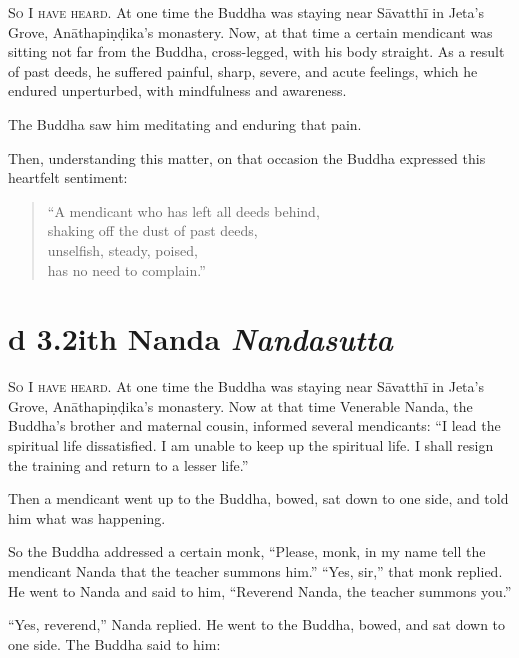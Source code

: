 \documentclass[12pt,openany]{book}%
\newcommand*{\suttatitleacronym}[1]{\smaller[2]{#1}\vspace*{.3em}}
\newcommand*{\suttatitletranslation}[1]{\linebreak{#1}}
\newcommand*{\suttatitleroot}[1]{\linebreak\smaller[2]\itshape{#1}}
\newcommand*{\tocacronym}[1]{\hspace*{-3.3em}{#1}\quad}
\newcommand*{\toctranslation}[1]{#1}
\newcommand*{\tocroot}[1]{(\textit{#1})}
\newcommand*{\scevam}[1]{\textsc{#1}}
\begin{document}
\scevam{So I have heard. }At one time the Buddha was staying near \textsanskrit{Sāvatthī} in Jeta’s Grove, \textsanskrit{Anāthapiṇḍika}’s monastery. Now, at that time a certain mendicant was sitting not far from the Buddha, cross-legged, with his body straight. As a result of past deeds, he suffered painful, sharp, severe, and acute feelings, which he endured unperturbed, with mindfulness and awareness. 

The Buddha saw him meditating and enduring that pain. 

Then, understanding this matter, on that occasion the Buddha expressed this heartfelt sentiment: 

\begin{verse}%
“A mendicant who has left all deeds behind, \\
shaking off the dust of past deeds, \\
unselfish, steady, poised, \\
has no need to complain.” 

%
\end{verse}

%
\section*{{\suttatitleacronym Ud 3.2}{\suttatitletranslation With Nanda }{\suttatitleroot Nandasutta}}
\addcontentsline{toc}{section}{\tocacronym{Ud 3.2} \toctranslation{With Nanda } \tocroot{Nandasutta}}

\scevam{So I have heard. }At one time the Buddha was staying near \textsanskrit{Sāvatthī} in Jeta’s Grove, \textsanskrit{Anāthapiṇḍika}’s monastery. Now at that time Venerable Nanda, the Buddha’s brother and maternal cousin, informed several mendicants: “I lead the spiritual life dissatisfied. I am unable to keep up the spiritual life. I shall resign the training and return to a lesser life.” 

Then a mendicant went up to the Buddha, bowed, sat down to one side, and told him what was happening. 

So the Buddha addressed a certain monk, “Please, monk, in my name tell the mendicant Nanda that the teacher summons him.” “Yes, sir,” that monk replied. He went to Nanda and said to him, “Reverend Nanda, the teacher summons you.” 

“Yes, reverend,” Nanda replied. He went to the Buddha, bowed, and sat down to one side. The Buddha said to him: 
\end{document}
